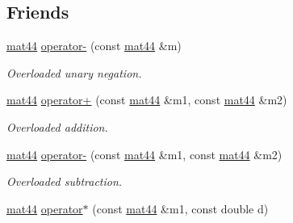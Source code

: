 \subsection*{\-Friends}
\begin{DoxyCompactItemize}
\item 
\hypertarget{classutil_1_1math_1_1mat44_a47029afe75a26a3bfabcc6a59b6d1867}{\hyperlink{classutil_1_1math_1_1mat44}{mat44} \hyperlink{classutil_1_1math_1_1mat44_a47029afe75a26a3bfabcc6a59b6d1867}{operator-\/} (const \hyperlink{classutil_1_1math_1_1mat44}{mat44} \&m)}\label{classutil_1_1math_1_1mat44_a47029afe75a26a3bfabcc6a59b6d1867}

\begin{DoxyCompactList}\small\item\em \-Overloaded unary negation. \end{DoxyCompactList}\item 
\hypertarget{classutil_1_1math_1_1mat44_a3fe2229d1266fd0dd969195c263f5602}{\hyperlink{classutil_1_1math_1_1mat44}{mat44} \hyperlink{classutil_1_1math_1_1mat44_a3fe2229d1266fd0dd969195c263f5602}{operator+} (const \hyperlink{classutil_1_1math_1_1mat44}{mat44} \&m1, const \hyperlink{classutil_1_1math_1_1mat44}{mat44} \&m2)}\label{classutil_1_1math_1_1mat44_a3fe2229d1266fd0dd969195c263f5602}

\begin{DoxyCompactList}\small\item\em \-Overloaded addition. \end{DoxyCompactList}\item 
\hypertarget{classutil_1_1math_1_1mat44_ad65f699bcf532e66986268272bc7c8e3}{\hyperlink{classutil_1_1math_1_1mat44}{mat44} \hyperlink{classutil_1_1math_1_1mat44_ad65f699bcf532e66986268272bc7c8e3}{operator-\/} (const \hyperlink{classutil_1_1math_1_1mat44}{mat44} \&m1, const \hyperlink{classutil_1_1math_1_1mat44}{mat44} \&m2)}\label{classutil_1_1math_1_1mat44_ad65f699bcf532e66986268272bc7c8e3}

\begin{DoxyCompactList}\small\item\em \-Overloaded subtraction. \end{DoxyCompactList}\item 
\hypertarget{classutil_1_1math_1_1mat44_a5748cc04863239e0b2e8a557152f6fba}{\hyperlink{classutil_1_1math_1_1mat44}{mat44} \hyperlink{classutil_1_1math_1_1mat44_a5748cc04863239e0b2e8a557152f6fba}{operator$\ast$} (const \hyperlink{classutil_1_1math_1_1mat44}{mat44} \&m1, const double d)}\label{classutil_1_1math_1_1mat44_a5748cc04863239e0b2e8a557152f6fba}


\end{DoxyCompactItemize}
